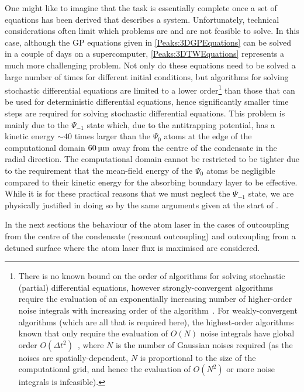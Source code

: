 One might like to imagine that the task is essentially complete once a set of equations has been derived that describes a system. Unfortunately, technical considerations often limit which problems are and are not feasible to solve. In this case, although the GP equations given in \eqref{Peaks:3DGPEquations} can be solved in a couple of days on a supercomputer, \eqref{Peaks:3DTWEquations} represents a much more challenging problem. Not only do these equations need to be solved a large number of times for different initial conditions, but algorithms for solving stochastic differential equations are limited to a lower order\footnote{There is no known bound on the order of algorithms for solving stochastic (partial) differential equations, however strongly-convergent algorithms \citep{KloedenPlaten} require the evaluation of an exponentially increasing number of higher-order noise integrals with increasing order of the algorithm~\citep{Burrage:1997}. For weakly-convergent algorithms \citep{KloedenPlaten} (which are all that is required here), the highest-order algorithms known that only require the evaluation of $O(N)$ noise integrals have global order $O(\Delta t^2)$~\citep{Rosler:2007,Rosler:2009}, where $N$ is the number of Gaussian noises required (as the noises are spatially-dependent, $N$ is proportional to the size of the computational grid, and hence the evaluation of $O(N^2)$ or more noise integrals is infeasible).} than those that can be used for deterministic differential equations, hence significantly smaller time steps are required for solving stochastic differential equations. This problem is mainly due to the $\Psi_{-1}$ state which, due to the antitrapping potential, has a kinetic energy $\sim 40$ times larger than the $\Psi_{0}$ atoms at the edge of the computational domain $\unit[60]{\micro m}$ away from the centre of the condensate in the radial direction. The computational domain cannot be restricted to be tighter due to the requirement that the mean-field energy of the $\Psi_{0}$ atoms be negligible compared to their kinetic energy for the absorbing boundary layer to be effective. While it is for these practical reasons that we must neglect the $\Psi_{-1}$ state, we are physically justified in doing so by the same arguments given at the start of . 

In the next sections the behaviour of the atom laser in the cases of outcoupling from the centre of the condensate (resonant outcoupling) and outcoupling from a detuned surface where the atom laser flux is maximised are considered.


